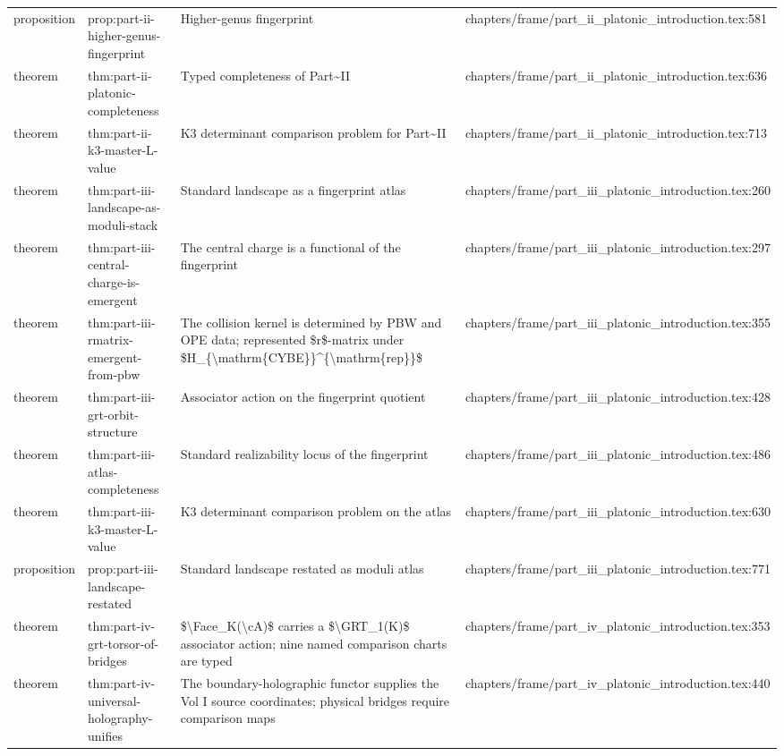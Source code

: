 \documentclass[11pt]{article}
\begin{document}
\begin{longtable}{L{0.10\textwidth}L{0.26\textwidth}L{0.42\textwidth}L{0.22\textwidth}}
proposition & prop:part-ii-higher-genus-fingerprint & Higher-genus fingerprint & chapters/frame/part\_ii\_platonic\_introduction.tex:581\\
theorem & thm:part-ii-platonic-completeness & Typed completeness of Part\textasciitilde{}II & chapters/frame/part\_ii\_platonic\_introduction.tex:636\\
theorem & thm:part-ii-k3-master-L-value & K3 determinant comparison problem for Part\textasciitilde{}II & chapters/frame/part\_ii\_platonic\_introduction.tex:713\\
theorem & thm:part-iii-landscape-as-moduli-stack & Standard landscape as a fingerprint atlas & chapters/frame/part\_iii\_platonic\_introduction.tex:260\\
theorem & thm:part-iii-central-charge-is-emergent & The central charge is a functional of the fingerprint & chapters/frame/part\_iii\_platonic\_introduction.tex:297\\
theorem & thm:part-iii-rmatrix-emergent-from-pbw & The collision kernel is determined by PBW and OPE data; represented \$r\$-matrix under \$H\_\{\textbackslash{}mathrm\{CYBE\}\}\textasciicircum{}\{\textbackslash{}mathrm\{rep\}\}\$ & chapters/frame/part\_iii\_platonic\_introduction.tex:355\\
theorem & thm:part-iii-grt-orbit-structure & Associator action on the fingerprint quotient & chapters/frame/part\_iii\_platonic\_introduction.tex:428\\
theorem & thm:part-iii-atlas-completeness & Standard realizability locus of the fingerprint & chapters/frame/part\_iii\_platonic\_introduction.tex:486\\
theorem & thm:part-iii-k3-master-L-value & K3 determinant comparison problem on the atlas & chapters/frame/part\_iii\_platonic\_introduction.tex:630\\
proposition & prop:part-iii-landscape-restated & Standard landscape restated as moduli atlas & chapters/frame/part\_iii\_platonic\_introduction.tex:771\\
theorem & thm:part-iv-grt-torsor-of-bridges & \$\textbackslash{}Face\_K(\textbackslash{}cA)\$ carries a \$\textbackslash{}GRT\_1(K)\$ associator action; nine named comparison charts are typed & chapters/frame/part\_iv\_platonic\_introduction.tex:353\\
theorem & thm:part-iv-universal-holography-unifies & The boundary-holographic functor supplies the Vol I source coordinates; physical bridges require comparison maps & chapters/frame/part\_iv\_platonic\_introduction.tex:440\\

\end{longtable}
\end{document}
